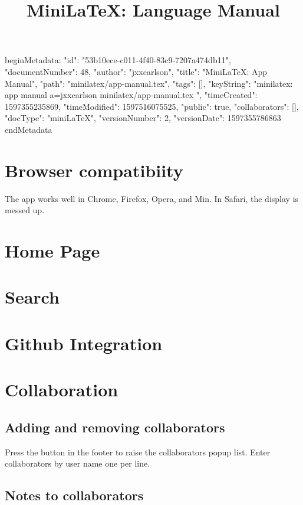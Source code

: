 beginMetadata:
{
    "id": "53b10ece-c011-4f40-83c9-7207a474db11",
    "documentNumber": 48,
    "author": "jxxcarlson",
    "title": "MiniLaTeX: App Manual",
    "path": "minilatex/app-manual.tex",
    "tags": [],
    "keyString": "minilatex: app manual a=jxxcarlson minilatex/app-manual.tex ",
    "timeCreated": 1597355235869,
    "timeModified": 1597516075525,
    "public": true,
    "collaborators": [],
    "docType": "miniLaTeX",
    "versionNumber": 2,
    "versionDate": 1597355786863
}
endMetadata

\title{MiniLaTeX: Language Manual}

\maketitle

\tableofcontents


\section{Browser compatibiity}

The app works well in Chrome, Firefox, Opera, and Min.   In Safari, the display is messed up.


\section{Home Page}

\section{Search}

\section{Github Integration}


\section{Collaboration}

\subsection{Adding and removing collaborators}

Press the  button in the footer to raise the collaborators popup list.  Enter collaborators by user name one per line.


\subsection{Notes to collaborators}

